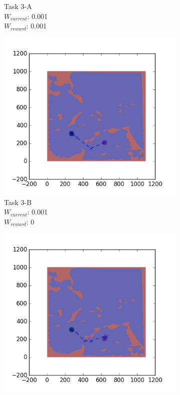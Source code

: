 \documentclass{tamuccthesis}
\begin{document}
\begin{figure}
\begin{subfigure}[b]{0.24\textwidth}
        \caption{{\small Task 3-A \\ $W_{current}$: 0.001 \\ $W_{reward}$: 0.001}}   
        \label{fig:Path_3-A_upCurrent_Reward}
    \end{subfigure}
    \begin{subfigure}[b]{0.24\textwidth}
        \centering
        \includegraphics[width=\textwidth,trim={4cm 3cm 2cm 3cm},clip]{EXP3RG_PathCb_-1_-1_0d001_0.png}
        \caption{{\small Task 3-B \\ $W_{current}$: 0.001 \\ $W_{reward}$: 0}}    
        \label{fig:Path_3-B_upCurrent_noReward}
    \end{subfigure}
    \begin{subfigure}[b]{0.24\textwidth}  
        \centering 
        \includegraphics[width=\textwidth,trim={4cm 3cm 2cm 3cm},clip]{EXP3RG_PathCb_-1_-1_0d001_-1.png}

\end{subfigure}
\end{figure}
\end{document}
